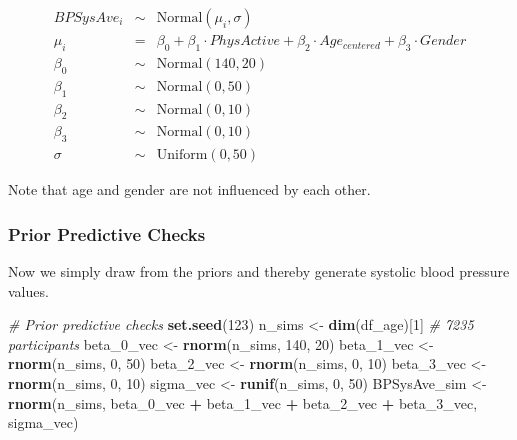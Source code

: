 \documentclass[
]{book}
\newenvironment{Shaded}{\begin{snugshade}}{\end{snugshade}}
\newcommand{\CommentTok}[1]{\textcolor[rgb]{0.56,0.35,0.01}{\textit{#1}}}
\newcommand{\DecValTok}[1]{\textcolor[rgb]{0.00,0.00,0.81}{#1}}
\newcommand{\FunctionTok}[1]{\textcolor[rgb]{0.13,0.29,0.53}{\textbf{#1}}}
\newcommand{\NormalTok}[1]{#1}
\newcommand{\OtherTok}[1]{\textcolor[rgb]{0.56,0.35,0.01}{#1}}
\newcommand{\SpecialCharTok}[1]{\textcolor[rgb]{0.81,0.36,0.00}{\textbf{#1}}}
\begin{document}
\begin{eqnarray*}
BPSysAve_i &\sim& \text{Normal}(\mu_i, \sigma)\\
\mu_i &=& \beta_0 + \beta_1 \cdot PhysActive + \beta_2 \cdot Age_{centered} + \beta_3 \cdot Gender\\
\beta_0 &\sim& \text{Normal}(140, 20)\\
\beta_1 &\sim& \text{Normal}(0, 50)\\
\beta_2 &\sim& \text{Normal}(0, 10)\\
\beta_3 &\sim& \text{Normal}(0, 10)\\
\sigma &\sim& \text{Uniform}(0, 50)
\end{eqnarray*}

Note that age and gender are not influenced by each other.

\subsubsection{Prior Predictive Checks}\label{prior_predictive_checks_NHANES}

Now we simply draw from the priors and thereby generate systolic blood pressure values.

\begin{Shaded}
\begin{Highlighting}[]
\CommentTok{\# Prior predictive checks}
\FunctionTok{set.seed}\NormalTok{(}\DecValTok{123}\NormalTok{)}
\NormalTok{n\_sims }\OtherTok{\textless{}{-}} \FunctionTok{dim}\NormalTok{(df\_age)[}\DecValTok{1}\NormalTok{] }\CommentTok{\# 7235 participants}
\NormalTok{beta\_0\_vec }\OtherTok{\textless{}{-}} \FunctionTok{rnorm}\NormalTok{(n\_sims, }\DecValTok{140}\NormalTok{, }\DecValTok{20}\NormalTok{)}
\NormalTok{beta\_1\_vec }\OtherTok{\textless{}{-}} \FunctionTok{rnorm}\NormalTok{(n\_sims, }\DecValTok{0}\NormalTok{, }\DecValTok{50}\NormalTok{)}
\NormalTok{beta\_2\_vec }\OtherTok{\textless{}{-}} \FunctionTok{rnorm}\NormalTok{(n\_sims, }\DecValTok{0}\NormalTok{, }\DecValTok{10}\NormalTok{)}
\NormalTok{beta\_3\_vec }\OtherTok{\textless{}{-}} \FunctionTok{rnorm}\NormalTok{(n\_sims, }\DecValTok{0}\NormalTok{, }\DecValTok{10}\NormalTok{)}
\NormalTok{sigma\_vec }\OtherTok{\textless{}{-}} \FunctionTok{runif}\NormalTok{(n\_sims, }\DecValTok{0}\NormalTok{, }\DecValTok{50}\NormalTok{)}
\NormalTok{BPSysAve\_sim }\OtherTok{\textless{}{-}} \FunctionTok{rnorm}\NormalTok{(n\_sims, beta\_0\_vec }\SpecialCharTok{+}\NormalTok{ beta\_1\_vec }\SpecialCharTok{+}\NormalTok{ beta\_2\_vec }\SpecialCharTok{+}\NormalTok{ beta\_3\_vec, sigma\_vec)}
\end{Highlighting}
\end{Shaded}
\end{document}
